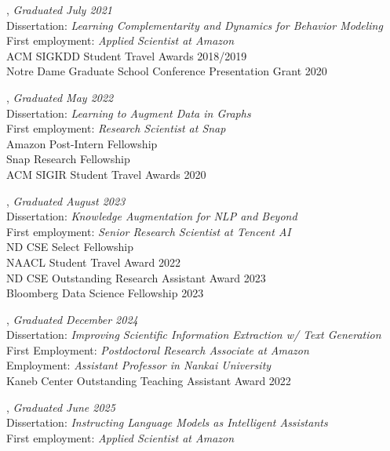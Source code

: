 \documentclass[10pt]{article}
\newenvironment{myindentpar}[1]%
{\begin{list}{}%
         {\setlength{\leftmargin}{#1}}%
         \item[]%
}
{\end{list}}
\newcounter{list}
\begin{document}
\begin{myindentpar}{0.75cm}

\hspace{-0.75cm}{\bf Daheng Wang}, \textit{Graduated July 2021} \\
	{Dissertation: \textit{Learning Complementarity and Dynamics for Behavior Modeling}} \\
	{First employment: \textit{Applied Scientist at Amazon}} \\
	{ACM SIGKDD Student Travel Awards 2018/2019} \\
	{Notre Dame Graduate School Conference Presentation Grant 2020}

\hspace{-0.75cm}{\bf Tong Zhao}, \textit{Graduated May 2022} \\
	{Dissertation: \textit{Learning to Augment Data in Graphs}} \\
	{First employment: \textit{Research Scientist at Snap}} \\	
	{Amazon Post-Intern Fellowship} \\
	{Snap Research Fellowship} \\	
	{ACM SIGIR Student Travel Awards 2020}

\hspace{-0.75cm}{\bf Wenhao Yu}, \textit{Graduated August 2023} \\
	{Dissertation: \textit{Knowledge Augmentation for NLP and Beyond}} \\
	{First employment: \textit{Senior Research Scientist at Tencent AI}} \\	
	{ND CSE Select Fellowship} \\
	{NAACL Student Travel Award 2022} \\
	{ND CSE Outstanding Research Assistant Award 2023} \\
	{Bloomberg Data Science Fellowship 2023}

\hspace{-0.75cm}{\bf Qingkai Zeng}, \textit{Graduated December 2024} \\
	{Dissertation: \textit{Improving Scientific Information Extraction w/ Text Generation}} \\
	{First Employment: \textit{Postdoctoral Research Associate at Amazon}} \\
	{Employment: \textit{Assistant Professor in Nankai University}} \\	
	{Kaneb Center Outstanding Teaching Assistant Award 2022}

\hspace{-0.75cm}{\bf Zhihan Zhang}, \textit{Graduated June 2025} \\
	{Dissertation: \textit{Instructing Language Models as Intelligent Assistants}} \\
	{First employment: \textit{Applied Scientist at Amazon}}


\end{myindentpar}
\end{document}
